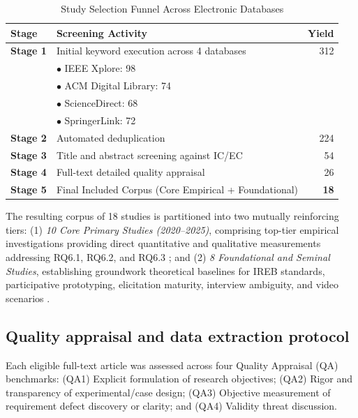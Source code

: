 \documentclass[conference]{IEEEtran}
\begin{document}
\begin{table}[htbp]
\centering
\caption{Study Selection Funnel Across Electronic Databases}
\label{tab:selection_funnel}
\begin{tabularx}{\columnwidth}{l X r}
\toprule
\textbf{Stage} & \textbf{Screening Activity} & \textbf{Yield} \\
\midrule
\textbf{Stage 1} & Initial keyword execution across 4 databases & 312 \\
                 & \quad $\bullet$ IEEE Xplore: 98 & \\
                 & \quad $\bullet$ ACM Digital Library: 74 & \\
                 & \quad $\bullet$ ScienceDirect: 68 & \\
                 & \quad $\bullet$ SpringerLink: 72 & \\
\textbf{Stage 2} & Automated deduplication & 224 \\
\textbf{Stage 3} & Title and abstract screening against IC/EC & 54 \\
\textbf{Stage 4} & Full-text detailed quality appraisal & 26 \\
\textbf{Stage 5} & Final Included Corpus (Core Empirical + Foundational) & \textbf{18} \\
\bottomrule
\end{tabularx}
\end{table}

The resulting corpus of 18 studies is partitioned into two mutually reinforcing tiers: (1) \textit{10 Core Primary Studies (2020--2025)}, comprising top-tier empirical investigations providing direct quantitative and qualitative measurements addressing RQ6.1, RQ6.2, and RQ6.3 \cite{bjarnason2023empirically, rueda2020requirements, uv2023empirical, rej2022evolve, antonelli2022iterative, bano2023videos, gupta2022strategic, acm2022proposal, diaz2021gender, cascon2025ambiguity}; and (2) \textit{8 Foundational and Seminal Studies}, establishing groundwork theoretical baselines for IREB standards, participative prototyping, elicitation maturity, interview ambiguity, and video scenarios \cite{pohl2016requirements, hickey1998prototyping, abad2018loud, jserd2019protopersona, davis2018maturity, ferrari2016ambiguity, spoletini2018interview, brill2010videos}.

\subsection{Quality appraisal and data extraction protocol}
Each eligible full-text article was assessed across four Quality Appraisal (QA) benchmarks: (QA1) Explicit formulation of research objectives; (QA2) Rigor and transparency of experimental/case design; (QA3) Objective measurement of requirement defect discovery or clarity; and (QA4) Validity threat discussion.
\end{document}

